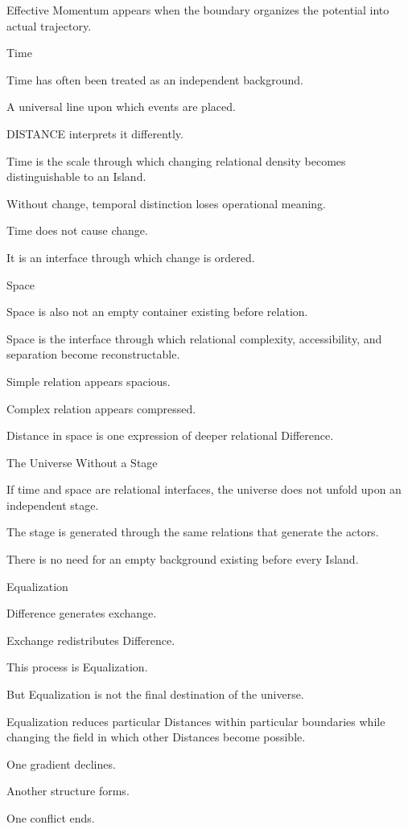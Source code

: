 Effective Momentum appears when the boundary organizes the potential into actual trajectory.

Time

Time has often been treated as an independent background.

A universal line upon which events are placed.

DISTANCE interprets it differently.

Time is the scale through which changing relational density becomes distinguishable to an Island.

Without change, temporal distinction loses operational meaning.

Time does not cause change.

It is an interface through which change is ordered.

Space

Space is also not an empty container existing before relation.

Space is the interface through which relational complexity, accessibility, and separation become reconstructable.

Simple relation appears spacious.

Complex relation appears compressed.

Distance in space is one expression of deeper relational Difference.

The Universe Without a Stage

If time and space are relational interfaces, the universe does not unfold upon an independent stage.

The stage is generated through the same relations that generate the actors.

There is no need for an empty background existing before every Island.

Equalization

Difference generates exchange.

Exchange redistributes Difference.

This process is Equalization.

But Equalization is not the final destination of the universe.

Equalization reduces particular Distances within particular boundaries while changing the field in which other Distances become possible.

One gradient declines.

Another structure forms.

One conflict ends.

